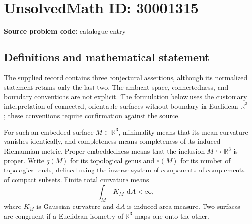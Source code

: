 \documentclass[11pt]{article}
\newcommand{\R}{\mathbb{R}}
\begin{document}
\section*{UnsolvedMath ID: 30001315}
\textbf{Source problem code:} catalogue entry
\subsection{Definitions and mathematical statement}
The supplied record contains three conjectural assertions, although its normalized statement retains only the last two. The ambient space, connectedness, and boundary conventions are not explicit. The formulation below uses the customary interpretation of connected, orientable surfaces without boundary in Euclidean \(\R^3\); these conventions require confirmation against the source.

For such an embedded surface \(M\subset\R^3\), minimality means that its mean curvature vanishes identically, and completeness means completeness of its induced Riemannian metric. Proper embeddedness means that the inclusion \(M\hookrightarrow\R^3\) is proper. Write \(g(M)\) for its topological genus and \(e(M)\) for its number of topological ends, defined using the inverse system of components of complements of compact subsets. Finite total curvature means
\[
\int_M |K_M|\,\mathrm dA<\infty,
\]
where \(K_M\) is Gaussian curvature and \(\mathrm dA\) is induced area measure. Two surfaces are congruent if a Euclidean isometry of \(\R^3\) maps one onto the other.
\end{document}
